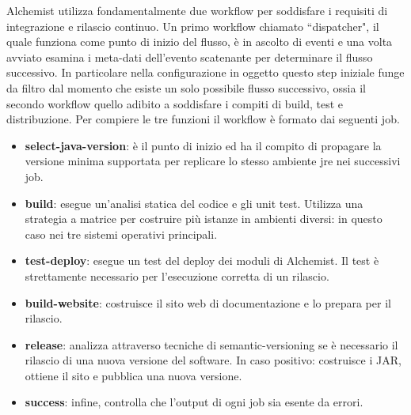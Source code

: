 Alchemist utilizza fondamentalmente due workflow per soddisfare i requisiti di integrazione e rilascio continuo. Un primo workflow chiamato ``dispatcher", il quale funziona come punto di inizio del flusso, è in ascolto di eventi e una volta avviato esamina i meta-dati dell'evento scatenante per determinare il flusso successivo. In particolare nella configurazione in oggetto questo step iniziale funge da filtro dal momento che esiste un solo possibile flusso successivo, ossia il secondo workflow quello adibito a soddisfare i compiti di build, test e distribuzione.
Per compiere le tre funzioni il workflow è formato dai seguenti job.
\begin{itemize}
	\item \textbf{select-java-version}: è il punto di inizio ed ha il compito di propagare la versione minima supportata per replicare lo stesso ambiente \ac{jre} nei successivi job.
	\item \textbf{build}: esegue un'analisi statica del codice e gli unit test. Utilizza una strategia a matrice per costruire più istanze in ambienti diversi: in questo caso nei tre sistemi operativi principali. 
	\item \textbf{test-deploy}: esegue un test del deploy dei moduli di Alchemist. Il test è strettamente necessario per l'esecuzione corretta di un rilascio.
	\item \textbf{build-website}: costruisce il sito web di documentazione e lo prepara per il rilascio.
	\item \textbf{release}: analizza attraverso tecniche di semantic-versioning se è necessario il rilascio di una nuova versione del software. In caso positivo: costruisce i JAR, ottiene il sito e pubblica una nuova versione.
	\item \textbf{success}: infine, controlla che l'output di ogni job sia esente da errori.
\end{itemize}

